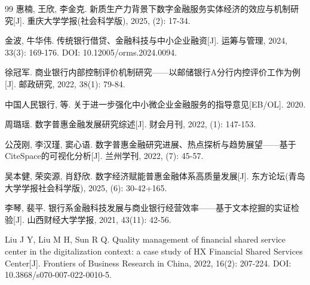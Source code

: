 \begin{thebibliography}{99}
 惠楠, 王欣, 李金克. 新质生产力背景下数字金融服务实体经济的效应与机制研究[J]. 重庆大学学报(社会科学版), 2025, (2): 17-34.

 金波, 牛华伟. 传统银行借贷、金融科技与中小企业融资[J]. 运筹与管理, 2024, 33(3): 169-176. DOI: 10.12005/orms.2024.0094.

 徐冠军. 商业银行内部控制评价机制研究——以邮储银行A分行内控评价工作为例[J]. 邮政研究, 2022, 38(1): 79-84.

 中国人民银行, 等. 关于进一步强化中小微企业金融服务的指导意见[EB/OL]. 2020.

 周璐瑶. 数字普惠金融发展研究综述[J]. 财会月刊, 2022, (1): 147-153.

 公茂刚, 李汉瑾, 窦心语. 数字普惠金融研究进展、热点探析与趋势展望——基于CiteSpace的可视化分析[J]. 兰州学刊, 2022, (7): 45-57.

 吴本健, 荣奕源, 肖舒欣. 数字经济赋能普惠金融体系高质量发展[J]. 东方论坛(青岛大学学报社会科学版), 2025, (6): 30-42+165.

 李琴, 裴平. 银行系金融科技发展与商业银行经营效率——基于文本挖掘的实证检验[J]. 山西财经大学学报, 2021, 43(11): 42-56.

 Liu J Y, Liu M H, Sun R Q. Quality management of financial shared service center in the digitalization context: a case study of HX Financial Shared Services Center[J]. Frontiers of Business Research in China, 2022, 16(2): 207-224. DOI: 10.3868/s070-007-022-0010-5.

\end{thebibliography}
